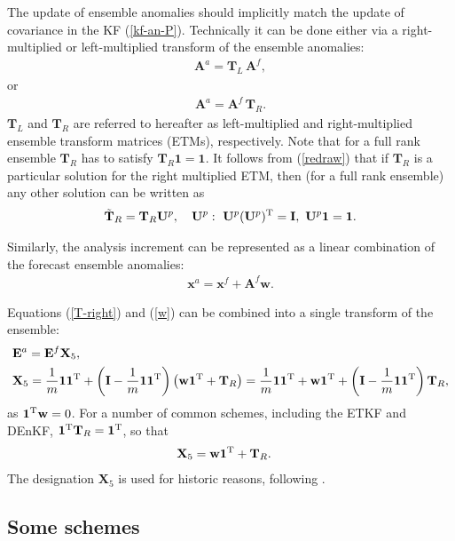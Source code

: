 \documentclass[11pt]{report}
\newcommand{\mb} {\mathbf}
\newcommand{\T}{^{\tiny \mathrm T}}
\begin{document}
The update of ensemble anomalies should implicitly match the update of covariance in the KF (\ref{kf-an-P}).
Technically it can be done either via a right-multiplied or left-multiplied transform of the ensemble anomalies:
\begin{align}
  \label{T-left}
  \mb A^a = \mb T_L \,\mb A^f,
\end{align}
or
\begin{align}
  \label{T-right}
  \mb A^a = \mb A^f \, \mb T_R.
\end{align}
$\mb T_L$ and $\mb T_R$ are referred to hereafter as left-multiplied and right-multiplied ensemble transform matrices (ETMs), respectively.
Note that for a full rank ensemble $\mb T_R$ has to satisfy $\mb T_R \mb 1 = \mb 1$.
It follows from (\ref{redraw}) that if $\mb T_R$ is a particular solution for the right multiplied ETM, then (for a full rank ensemble) any other solution can be written as
\begin{align}
  \tilde{\mb T}_R = \mb T_R \mb U^p, \quad \mb U^p:\ \mb U^p (\mb U^p)\T = \mb I,\ \mb U^p \mb 1 = \mb 1.
\end{align}

Similarly, the analysis increment can be represented as a linear combination of the forecast ensemble anomalies:
\begin{align}
  \label{w}
  \mb x^a = \mb x^f + \mb A^f \mb w.
\end{align}

Equations (\ref{T-right}) and (\ref{w}) can be combined into a single transform of the ensemble:
\begin{align}
  \label{x5-def}
  & \mb E^a = \mb E^f \mb X_5,\\
  & \mb X_5 = \frac{1}{m} \mb 1 \mb 1\T + \left( \mb I - \frac{1}{m} \mb 1 \mb 1\T\right) \left( \mb w \mb 1\T + \mb T_R\right)
  = \frac{1}{m} \mb 1 \mb 1\T + \mb w \mb 1\T + \left( \mb I - \frac{1}{m} \mb 1 \mb 1\T \right) \mb T_R,
\end{align}
as $\mb 1\T \mb w = 0$. 
For a number of common schemes, including the ETKF and DEnKF, $\mb 1\T \mb T_R = \mb 1\T$, so that
\begin{align}
  \label{x5}
  & \mb X_5 = \mb w \mb 1\T + \mb T_R.
\end{align}
The designation $\mb X_5$ is used for historic reasons, following \citet{eve03a}.

\subsection{Some schemes}
\end{document}
